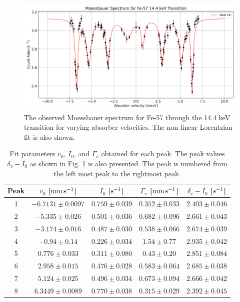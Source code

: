 \documentclass[a4paper]{report}
\numberwithin{equation}{section}
\begin{document}
\begin{figure}[htb!]
	\centering
	\includegraphics[width=0.8\columnwidth]{moess_spect.png}
	\caption{The observed Moessbauer spectrum for Fe-57 through the 14.4 keV transition for varying absorber velocities. The 
	non-linear Lorentzian fit is also shown.}
	\label{fig:moess_spect}
\end{figure}

\begin{table}[!ht]
    \centering
    \begin{tabular}{|c|c|c|c|c|}
    \hline
    Peak & $v_0$ [$\si[]{\milli\meter\per\second}$] & $I_0$ [$\si[]{\per\second}$] & $\Gamma_v$ [$\si[]{\milli\meter\per\second}$] & $\delta_v - I_0$ [$\si[]{\per\second}$]\\ \hline
        1 &$-6.7131 \pm 0.0097 $& $0.759 \pm 0.039$ & $0.352 \pm 0.033$ & $2.403 \pm 0.046$ \\ \hline
        2 &$-5.335 \pm 0.026 $& $0.501 \pm 0.036$ & $0.682 \pm 0.096$ & $2.661 \pm 0.043$ \\ \hline
        3 &$-3.174 \pm 0.016 $& $0.487 \pm 0.030$ & $0.538 \pm 0.066$ & $2.674 \pm 0.039$ \\ \hline
        4 &$-0.94 \pm 0.14 $& $0.226 \pm 0.034$ & $1.54 \pm 0.77$ & $2.935 \pm 0.042$ \\ \hline
        5 &$ 0.776 \pm 0.033 $& $0.311 \pm 0.080$ & $0.43 \pm 0.20$ & $2.851 \pm 0.084$ \\ \hline
        6 &$ 2.958 \pm 0.015 $& $0.476 \pm 0.028$ & $0.583 \pm 0.064$ & $2.685 \pm 0.038$ \\ \hline
        7 &$ 5.124 \pm 0.025 $& $0.496 \pm 0.034$ & $0.673 \pm 0.094$ & $2.666 \pm 0.042$ \\ \hline
        8 &$ 6.3449 \pm 0.0089 $& $0.770 \pm 0.038$ & $0.315 \pm 0.029$ & $2.392 \pm 0.045$ \\ \hline
    \end{tabular}
    \caption{Fit parameters $v_0$, $I_0$, and $\Gamma_v$ obtained for each peak. The peak values $\delta_v - I_0$ 
			as shown in Fig. \ref{fig:moess_spect} is also presented.
			 The peak is numbered from the left most peak to the rightmost peak.}
	\label{tab:fit_params}
\end{table}
\end{document}
